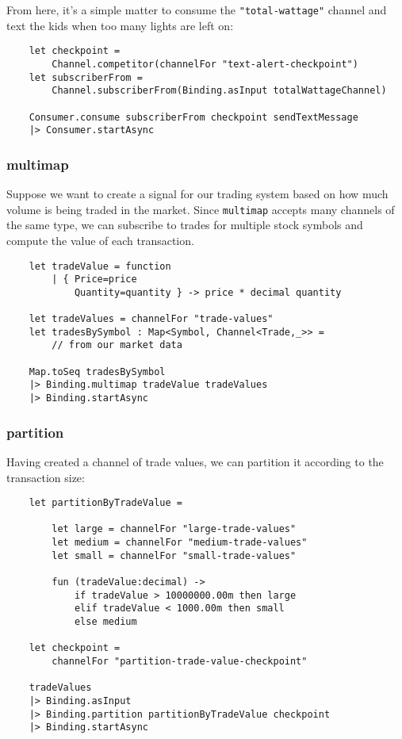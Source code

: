 \documentclass{article}
\begin{document}
From here, it's a simple matter to consume the \texttt{"total-wattage"} channel and text the kids when too many lights are left on:

\begin{verbatim}
    let checkpoint =
        Channel.competitor(channelFor "text-alert-checkpoint")
    let subscriberFrom =
        Channel.subscriberFrom(Binding.asInput totalWattageChannel)

    Consumer.consume subscriberFrom checkpoint sendTextMessage
    |> Consumer.startAsync
\end{verbatim}

\subsubsection{multimap}

Suppose we want to create a signal for our trading system based on how much volume is being traded in the market.  Since \texttt{multimap} accepts many channels of the same type, we can subscribe to trades for multiple stock symbols and compute the value of each transaction.

\begin{verbatim}
    let tradeValue = function
        | { Price=price
            Quantity=quantity } -> price * decimal quantity

    let tradeValues = channelFor "trade-values"
    let tradesBySymbol : Map<Symbol, Channel<Trade,_>> =
        // from our market data

    Map.toSeq tradesBySymbol
    |> Binding.multimap tradeValue tradeValues
    |> Binding.startAsync
\end{verbatim}

\subsubsection{partition}

Having created a channel of trade values, we can partition it according to the transaction size:

\begin{verbatim}
    let partitionByTradeValue =

        let large = channelFor "large-trade-values"
        let medium = channelFor "medium-trade-values"
        let small = channelFor "small-trade-values"
    
        fun (tradeValue:decimal) ->
            if tradeValue > 10000000.00m then large
            elif tradeValue < 1000.00m then small
            else medium

    let checkpoint =
        channelFor "partition-trade-value-checkpoint"

    tradeValues
    |> Binding.asInput
    |> Binding.partition partitionByTradeValue checkpoint
    |> Binding.startAsync
\end{verbatim}
\end{document}
